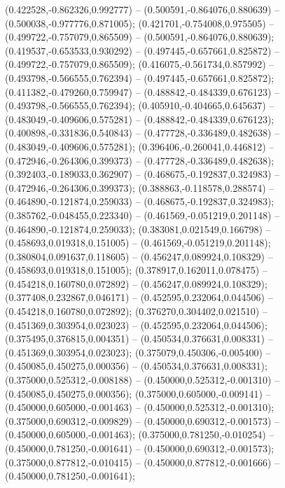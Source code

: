  (0.422528,-0.862326,0.992777) -- (0.500591,-0.864076,0.880639) -- (0.500038,-0.977776,0.871005);
 (0.421701,-0.754008,0.975505) -- (0.499722,-0.757079,0.865509) -- (0.500591,-0.864076,0.880639);
 (0.419537,-0.653533,0.930292) -- (0.497445,-0.657661,0.825872) -- (0.499722,-0.757079,0.865509);
 (0.416075,-0.561734,0.857992) -- (0.493798,-0.566555,0.762394) -- (0.497445,-0.657661,0.825872);
 (0.411382,-0.479260,0.759947) -- (0.488842,-0.484339,0.676123) -- (0.493798,-0.566555,0.762394);
 (0.405910,-0.404665,0.645637) -- (0.483049,-0.409606,0.575281) -- (0.488842,-0.484339,0.676123);
 (0.400898,-0.331836,0.540843) -- (0.477728,-0.336489,0.482638) -- (0.483049,-0.409606,0.575281);
 (0.396406,-0.260041,0.446812) -- (0.472946,-0.264306,0.399373) -- (0.477728,-0.336489,0.482638);
 (0.392403,-0.189033,0.362907) -- (0.468675,-0.192837,0.324983) -- (0.472946,-0.264306,0.399373);
 (0.388863,-0.118578,0.288574) -- (0.464890,-0.121874,0.259033) -- (0.468675,-0.192837,0.324983);
 (0.385762,-0.048455,0.223340) -- (0.461569,-0.051219,0.201148) -- (0.464890,-0.121874,0.259033);
 (0.383081,0.021549,0.166798) -- (0.458693,0.019318,0.151005) -- (0.461569,-0.051219,0.201148);
 (0.380804,0.091637,0.118605) -- (0.456247,0.089924,0.108329) -- (0.458693,0.019318,0.151005);
 (0.378917,0.162011,0.078475) -- (0.454218,0.160780,0.072892) -- (0.456247,0.089924,0.108329);
 (0.377408,0.232867,0.046171) -- (0.452595,0.232064,0.044506) -- (0.454218,0.160780,0.072892);
 (0.376270,0.304402,0.021510) -- (0.451369,0.303954,0.023023) -- (0.452595,0.232064,0.044506);
 (0.375495,0.376815,0.004351) -- (0.450534,0.376631,0.008331) -- (0.451369,0.303954,0.023023);
 (0.375079,0.450306,-0.005400) -- (0.450085,0.450275,0.000356) -- (0.450534,0.376631,0.008331);
 (0.375000,0.525312,-0.008188) -- (0.450000,0.525312,-0.001310) -- (0.450085,0.450275,0.000356);
 (0.375000,0.605000,-0.009141) -- (0.450000,0.605000,-0.001463) -- (0.450000,0.525312,-0.001310);
 (0.375000,0.690312,-0.009829) -- (0.450000,0.690312,-0.001573) -- (0.450000,0.605000,-0.001463);
 (0.375000,0.781250,-0.010254) -- (0.450000,0.781250,-0.001641) -- (0.450000,0.690312,-0.001573);
 (0.375000,0.877812,-0.010415) -- (0.450000,0.877812,-0.001666) -- (0.450000,0.781250,-0.001641);
